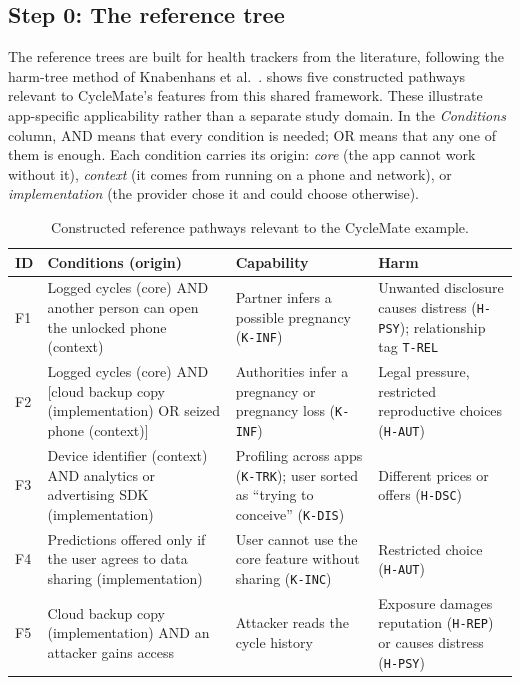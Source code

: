 \subsection*{Step 0: The reference tree}

The reference trees are built for health trackers from the literature,
following the harm-tree method of Knabenhans et
al.~\parencite{knabenhans2026harms}.  shows five constructed
pathways relevant to CycleMate's features from this shared framework. These
illustrate app-specific applicability rather than a separate study domain. In the
\emph{Conditions} column, AND means that every condition is
needed; OR means that any one of them is enough. Each condition carries its
origin: \emph{core} (the app cannot work without it), \emph{context} (it comes
from running on a phone and network), or \emph{implementation} (the provider
chose it and could choose otherwise).

\begin{table}[H]
\centering
\caption{Constructed reference pathways relevant to the CycleMate example.}
\label{tab:we-tree}
\small
\begin{tabularx}{\textwidth}{@{}l>{\raggedright\arraybackslash}X
                                   >{\raggedright\arraybackslash}p{3.1cm}
                                   >{\raggedright\arraybackslash}p{3.3cm}@{}}
\toprule
\textbf{ID} & \textbf{Conditions (origin)} & \textbf{Capability} & \textbf{Harm} \\
\midrule
F1 & Logged cycles (core) AND another person can open the unlocked phone
     (context)
   & Partner infers a possible pregnancy (\texttt{K-INF})
   & Unwanted disclosure causes distress (\texttt{H-PSY}); relationship tag
     \texttt{T-REL} \\
\addlinespace
F2 & Logged cycles (core) AND [cloud backup copy (implementation) OR seized
     phone (context)]
   & Authorities infer a pregnancy or pregnancy loss (\texttt{K-INF})
   & Legal pressure, restricted reproductive choices (\texttt{H-AUT}) \\
\addlinespace
F3 & Device identifier (context) AND analytics or advertising SDK
     (implementation)
   & Profiling across apps (\texttt{K-TRK}); user sorted as
     \enquote{trying to conceive} (\texttt{K-DIS})
   & Different prices or offers (\texttt{H-DSC}) \\
\addlinespace
F4 & Predictions offered only if the user agrees to data sharing
     (implementation)
   & User cannot use the core feature without sharing (\texttt{K-INC})
   & Restricted choice (\texttt{H-AUT}) \\
\addlinespace
F5 & Cloud backup copy (implementation) AND an attacker gains access
   & Attacker reads the cycle history
   & Exposure damages reputation (\texttt{H-REP}) or causes distress
     (\texttt{H-PSY}) \\
\bottomrule
\end{tabularx}
\end{table}

